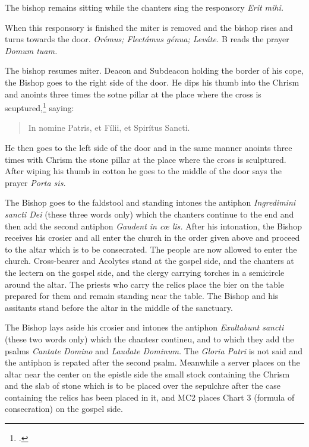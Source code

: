 \documentclass[letterpaper]{report}
\newcommand\src{\textsc{S.R.C.}}
\begin{document}
{\rubric The bishop remains sitting while the chanters sing the responsory
\textit{Erit mihi.}

\rubric When this responsory is finished the miter is removed and the bishop
rises and turns towards the door. \textit{Orémus; Flectámus génua; Leváte.} B
reads the prayer \textit{Domum tuam.}

\rubric The bishop resumes miter. Deacon and Subdeacon holding the border of
his cope, the Bishop goes to the right side of the door. He dips his thumb into
the Chrism and anoints three times the sotne pillar at the place where the
cross is scuptured,\footcite[The Pontifical says ''\textit{signat ostium,''}
which the \src, Aug. 7, 1875, n. 3364 ad VI, interprets to mean the two stone
or brick pillars at the sides of the door.][footnote 1, p. 83.]{consecranda}
saying:

\begin{quote}
   In nomine Pa\cross tris, et Fí\cross lii, et Spirítus \cross Sancti.
\end{quote}

He then goes to the left side of the door and in the same manner anoints three
times with Chrism the stone pillar at the place where the cross is sculptured.
After wiping his thumb in cotton he goes to the middle of the door says the
prayer \textit{Porta sis.}

\rubric The Bishop goes to the faldstool and standing intones the antiphon
\textit{Ingredimini sancti Dei} (these three words only) which the chanters
continue to the end and then add the second antiphon \textit{Gaudent in c\oe
lis.} After his intonation, the Bishop receives his crosier and all enter the
church in the order given above and proceed to the altar which is to be
consecrated. The people are now allowed to enter the church. Cross-bearer and
Acolytes stand at the gospel side, and the chanters at the lectern on the
gospel side, and the clergy carrying torches in a semicircle around the altar.
The priests who carry the relics place the bier on the table prepared for them
and remain standing near the table. The Bishop and his assitants stand before
the altar in the middle of the sanctuary.

\rubric The Bishop lays aside his crosier and intones the antiphon
\textit{Exultabunt sancti} (these two words only) which the chantesr contineu,
and to which they add the psalms \textit{Cantate Domino} and \textit{Laudate
Dominum.} The \textit{Gloria Patri} is not said and the antiphon is repated
after the second psalm. Meanwhile a server places on the altar near the center
on the epistle side the small stock containing the Chrism and the slab of stone
which is to be placed over the sepulchre after the case containing the relics
has been placed in it, and MC2 places Chart 3 (formula of consecration) on the
gospel side.

}
\end{document}
